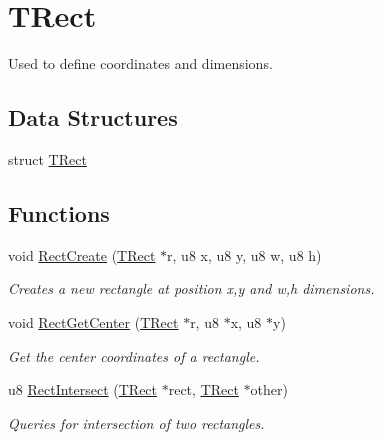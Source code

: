 \hypertarget{group__TRect}{}\section{T\+Rect}
\label{group__TRect}


Used to define coordinates and dimensions.  


\subsection*{Data Structures}
\begin{DoxyCompactItemize}
\item 
struct \mbox{\hyperlink{structTRect}{T\+Rect}}
\end{DoxyCompactItemize}
\subsection*{Functions}
\begin{DoxyCompactItemize}
\item 
void \mbox{\hyperlink{group__TRect_gaec082007d22f2533dccd8e2542514401}{Rect\+Create}} (\mbox{\hyperlink{structTRect}{T\+Rect}} $\ast$r, u8 x, u8 y, u8 w, u8 h)
\begin{DoxyCompactList}\small\item\em Creates a new rectangle at position x,y and w,h dimensions. \end{DoxyCompactList}\item 
void \mbox{\hyperlink{group__TRect_gac05f9cf832034413436d9aaeed3bbc72}{Rect\+Get\+Center}} (\mbox{\hyperlink{structTRect}{T\+Rect}} $\ast$r, u8 $\ast$x, u8 $\ast$y)
\begin{DoxyCompactList}\small\item\em Get the center coordinates of a rectangle. \end{DoxyCompactList}\item 
u8 \mbox{\hyperlink{group__TRect_ga2f135e151b08906abfa35b64a3d6b366}{Rect\+Intersect}} (\mbox{\hyperlink{structTRect}{T\+Rect}} $\ast$rect, \mbox{\hyperlink{structTRect}{T\+Rect}} $\ast$other)
\begin{DoxyCompactList}\small\item\em Queries for intersection of two rectangles. \end{DoxyCompactList}\end{DoxyCompactItemize}
